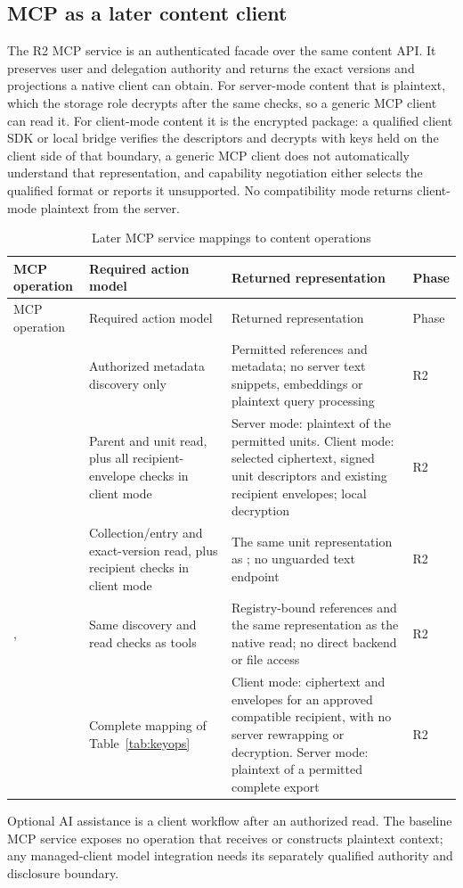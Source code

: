 \subsection{MCP as a later content client}
The R2 MCP service is an authenticated facade over the same content API. It preserves user and delegation authority and returns the exact versions and projections a native client can obtain. For server-mode content that is plaintext, which the storage role decrypts after the same checks, so a generic MCP client can read it. For client-mode content it is the encrypted package: a qualified client SDK or local bridge verifies the descriptors and decrypts with keys held on the client side of that boundary, a generic MCP client does not automatically understand that representation, and capability negotiation either selects the qualified format or reports it unsupported. No compatibility mode returns client-mode plaintext from the server.
\begin{longtable}{@{}P{0.22\textwidth}P{0.27\textwidth}P{0.32\textwidth}P{0.08\textwidth}@{}}
\caption{Later MCP service mappings to content operations}\label{tab:mcpops}\\
\toprule MCP operation & Required action model & Returned representation & Phase\\\midrule\endfirsthead
\toprule MCP operation & Required action model & Returned representation & Phase\\\midrule\endhead
{} & Authorized metadata discovery only & Permitted references and metadata; no server text snippets, embeddings or plaintext query processing & R2\\
 & Parent and unit read, plus all recipient-envelope checks in client mode & Server mode: plaintext of the permitted units. Client mode: selected ciphertext, signed unit descriptors and existing recipient envelopes; local decryption & R2\\
 & Collection/entry and exact-version read, plus recipient checks in client mode & The same unit representation as ; no unguarded text endpoint & R2\\
,  & Same discovery and read checks as tools & Registry-bound references and the same representation as the native read; no direct backend or file access & R2\\
 & Complete mapping of Table~\ref{tab:keyops} & Client mode: ciphertext and envelopes for an approved compatible recipient, with no server rewrapping or decryption. Server mode: plaintext of a permitted complete export & R2\\
\bottomrule
\end{longtable}
Optional AI assistance is a client workflow after an authorized read. The baseline MCP service exposes no  operation that receives or constructs plaintext context; any managed-client model integration needs its separately qualified authority and disclosure boundary.

